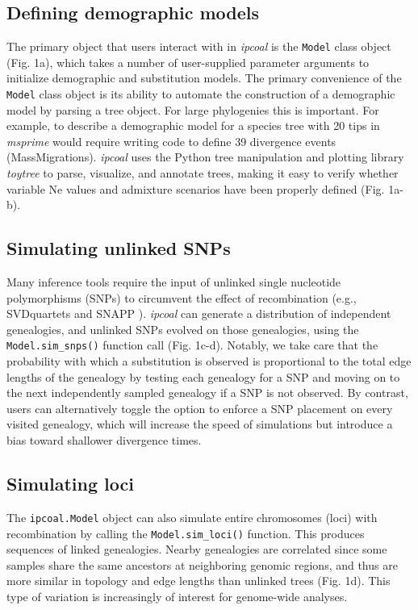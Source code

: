 \documentclass[11pt]{article}
\begin{document}
\subsection{Defining demographic models}
The primary object that users interact with in \emph{ipcoal} is the \texttt{Model} class object (Fig. 1a), which takes a number of user-supplied parameter arguments to initialize demographic and substitution models. The primary convenience of the \texttt{Model} class object is its ability to automate the construction of a demographic model by parsing a tree object. For large phylogenies this is important. For example, to describe a demographic model for a species tree with 20 tips in \emph{msprime} would require writing code to define 39 divergence events (MassMigrations). \emph{ipcoal} uses the Python tree manipulation and plotting library \emph{toytree} \citep{eaton_toytree_2020} to parse, visualize, and annotate trees, making it easy to verify whether variable Ne values and admixture scenarios have been properly defined (Fig. 1a-b). 

\subsection{Simulating unlinked SNPs}
Many inference tools require the input of unlinked single nucleotide polymorphisms (SNPs) to circumvent the effect of recombination (e.g., SVDquartets \citep{chifman_quartets_2014} and SNAPP \citep{bryant_snapp_2012}). \emph{ipcoal} can generate a distribution of independent genealogies, and unlinked SNPs evolved on those genealogies, using the \texttt{Model.sim\_snps()} function call (Fig. 1c-d). Notably, we take care that the probability with which a substitution is observed is proportional to the total edge lengths of the genealogy by testing each genealogy for a SNP and moving on to the next independently sampled genealogy if a SNP is not observed. By contrast, users can alternatively toggle the option to enforce a SNP placement on every visited genealogy, which will increase the speed of simulations but introduce a bias toward shallower divergence times. 

\subsection{Simulating loci}
The \texttt{ipcoal.Model} object can also simulate entire chromosomes (loci) with recombination by calling the \texttt{Model.sim\_loci()} function. This produces sequences of linked genealogies. Nearby genealogies are correlated since some samples share the same ancestors at neighboring genomic regions, and thus are more similar in topology and edge lengths than unlinked trees (Fig. 1d). This type of variation is increasingly of interest for genome-wide analyses.
\end{document}
